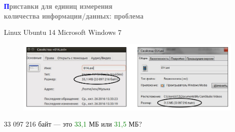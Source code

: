 \begin{frame}{\hspace{5.5cm}\textbf{\textcolor{blue}{П}\textcolor{gray}{риставки для единиц измерения\\\hspace{4cm}количества информации/данных: проблема}}}

    \fontsize{11pt}{13pt}\selectfont
    \hspace{2cm}Linux Ubuntu 14 \hspace{2.7cm}Microsoft Windows 7

    \begin{figure}
        \centering
        \includegraphics[scale =0.4]{Slide21.png}
    \end{figure}
    
    \medskip
    \fontsize{11pt}{13pt}\selectfont
    \hspace{2.5cm}33 097 216 байт — это \textcolor{Green}{33,1} МБ или \textcolor{Green}{31,5} МБ?
    
\end{frame}
